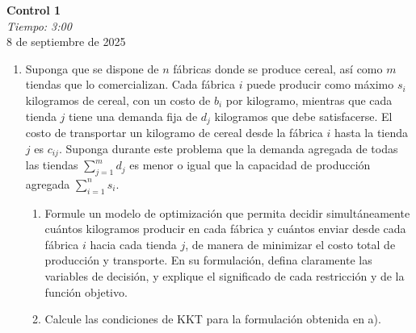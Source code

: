 \documentclass{article}
\begin{document}


\begin{center}
    \Huge{\textbf{Control 1}}\\
\textit{\large{Tiempo: 3:00}}\\
    \normalsize
    8 de septiembre de 2025
\end{center}

\begin{enumerate}
	\item Suponga que se dispone de \(n\) fábricas donde se produce cereal, así como \(m\) tiendas que lo comercializan. Cada fábrica \(i\) puede producir como máximo \(s_i\) kilogramos de cereal, con un costo de \(b_i\) por kilogramo, mientras que cada tienda \(j\) tiene una demanda fija de \(d_j\) kilogramos que debe satisfacerse. El costo de transportar un kilogramo de cereal desde la fábrica \(i\) hasta la tienda \(j\) es \(c_{ij}\). Suponga durante este problema que la demanda agregada de todas las tiendas \(\sum_{j=1}^m d_j\) es menor o igual que la capacidad de producción agregada \(\sum_{i=1}^n s_i\).
		\begin{enumerate}
			\item Formule un modelo de optimización que permita decidir simultáneamente cuántos kilogramos producir en cada fábrica y cuántos enviar desde cada fábrica \(i\) hacia cada tienda \(j\), de manera de minimizar el costo total de producción y transporte. En su formulación, defina claramente las variables de decisión, y explique el significado de cada restricción y de la función objetivo.
			\item Calcule las condiciones de KKT para la formulación obtenida en a).


\end{enumerate}
\end{enumerate}
\end{document}

